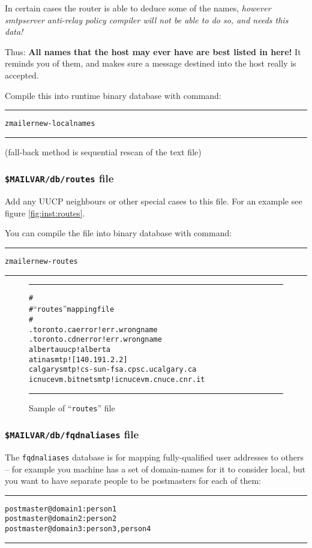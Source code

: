 In certain cases the router is able to deduce some of the names,
{\em however smtpserver anti-relay policy compiler will not be able
 to do so, and needs this data!}

Thus: {\bf All names that the host may ever have are best listed in here!}
It reminds you of them, and makes sure a message destined into the host
really is accepted.

Compile this into runtime binary database with command:
\begin{alltt}\medskip\hrule\medskip
  zmailer new-localnames
\medskip\hrule\medskip\end{alltt}
(fall-back method is sequential rescan of the text file)

\subsubsection{{\tt \$MAILVAR/db/routes} file}

Add any UUCP neighbours or other special cases to this file.
For an example see figure \vref{fig:inst:routes}.

You can compile the file into binary database with command:
\begin{alltt}\medskip\hrule\medskip
  zmailer new-routes
\medskip\hrule\medskip\end{alltt}

\begin{figure*}
\begin{alltt}\hrule\medskip
#
# ``routes'' mapping file
#
.toronto.ca      error!err.wrongname
.toronto.cdn     error!err.wrongname
alberta          uucp!alberta
atina            smtp![140.191.2.2]
calgary          smtp!cs-sun-fsa.cpsc.ucalgary.ca
icnucevm.bitnet  smtp!icnucevm.cnuce.cnr.it
\medskip\hrule\end{alltt}\medskip
\caption{\label{fig:inst:routes}Sample of ``{\tt routes}'' file}
\end{figure*}

\subsubsection{{\tt \$MAILVAR/db/fqdnaliases} file}

The {\tt fqdnaliases} database is for mapping fully-qualified user
addresses to others -- for example you machine has a set of
domain-names for it to consider local, but you want to have
separate people to be postmasters for each of them:
\begin{alltt}\medskip\hrule\medskip
postmaster@domain1: person1
postmaster@domain2: person2
postmaster@domain3: person3, person4
\medskip\hrule\medskip\end{alltt}


